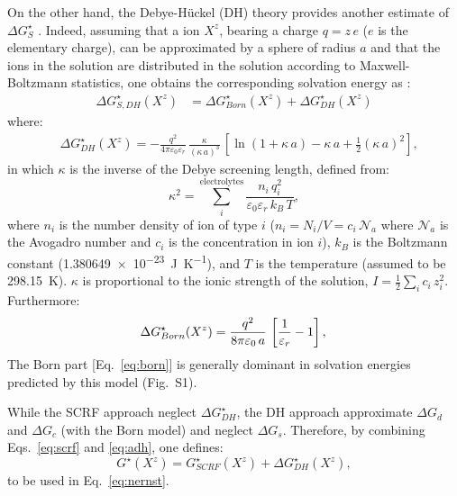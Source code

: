\documentclass[review,preprint]{elsarticle}
\begin{document}
On the other hand, the Debye-Hückel (DH) theory provides another estimate of $\Delta G_{S}^\star$ \cite{bockrisModernElectrochemistryIonics1998}. Indeed, assuming that a ion $X^z$, bearing a charge $q = z\,e$ ($e$ is the elementary charge), can be approximated by a sphere of radius $a$ and that the ions in the solution are distributed in the solution according to Maxwell-Boltzmann statistics, one obtains the corresponding solvation energy as \cite{kontogeorgisDebyeHuckelTheoryIts2018,silvaTrueHuckelEquation2022,silvaImprovingBornEquation2024}:\begin{align}
	\Delta G^\star_{S,DH}(X^z)
	&= \Delta G^\star_{Born}(X^z) + \Delta G^\star_{DH}(X^z)\label{eq:adh}
\end{align}
where:
\begin{align}
	&\Delta G^\star_{DH}(X^z) = -\frac{q^2}{4\pi\varepsilon_0\varepsilon_r}\,\frac{\kappa}{(\kappa\,a)^3}\,\left[\ln(1+\kappa\,a)-\kappa\,a+\frac{1}{2}(\kappa\,a)^2\right],\label{eq:dh} \end{align}
in which $\kappa$ is the inverse of the Debye screening length, defined from:\begin{equation}
	\kappa^2 = \sum_i^{\text{electrolytes}} \frac{n_i\,q_i^2}{\varepsilon_0\varepsilon_r\,k_B\,T}, \label{eq:kappa2}
\end{equation}
where $n_i$ is the number density of ion of type $i$ ($n_i = N_i / V = c_i\,\mathcal{N}_a$ where $\mathcal{N}_a$ is the Avogadro number and $c_i$ is the concentration in ion $i$), $k_B$ is the Boltzmann constant (\SI{1.380649e-23}{\joule\per\kelvin}), and $T$ is the temperature (assumed to be \SI{298.15}{\kelvin}).  $\kappa$ is  proportional to the ionic strength of the solution, $I = \frac{1}{2}\sum_i c_i\,z_i^2$. 
Furthermore:
\begin{equation}
	\Delta G^\star_{Born}(X^z) =\frac{q^2}{8\pi\varepsilon_0\,a}\,\left[\frac{1}{\varepsilon_r}-1\right], \label{eq:born}\\
\end{equation}
 The Born part [Eq.~\eqref{eq:born}] is generally dominant in solvation energies predicted by this model (Fig.~S1).
 
 While the SCRF approach neglect $\Delta G^\star_{DH}$, the DH approach approximate $\Delta G_{d}$ and $\Delta G_{c}$ (with the Born model) and neglect $\Delta G_{s}$. Therefore, by combining Eqs.~\eqref{eq:scrf} and \eqref{eq:adh}, one defines:\begin{equation}
	G^\star(X^z) = G^\star_{SCRF}(X^z) + \Delta G^\star_{DH}(X^z), \label{eq:gtot}
\end{equation}
to be used in Eq.~\eqref{eq:nernst}.
\end{document}
